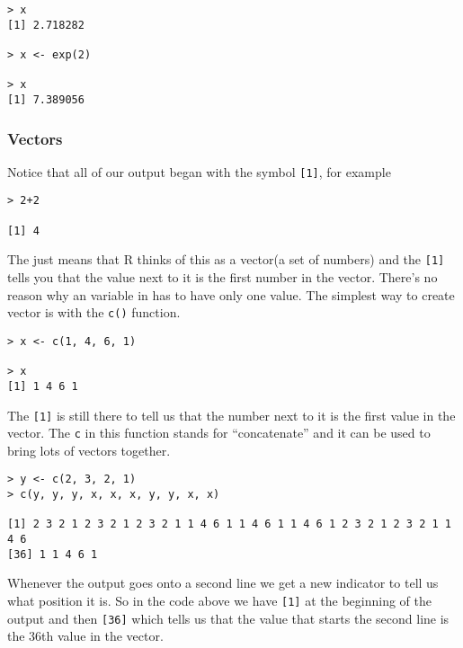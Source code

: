 \begin{lstlisting}
> x
[1] 2.718282

> x <- exp(2)

> x
[1] 7.389056
\end{lstlisting}


%

\subsubsection*{Vectors}
 
Notice that all of our output began with the symbol \texttt{[1]}, for example

\begin{lstlisting}
> 2+2

[1] 4
\end{lstlisting}

The just means that R thinks of this as a vector(a set of numbers) and the \texttt{[1]} tells you that the value next to it is the first number in the vector. There's no reason why an variable in \R has to have only one value. The simplest way to create vector is with the \texttt{c()} function.

\begin{lstlisting}
> x <- c(1, 4, 6, 1)

> x
[1] 1 4 6 1
\end{lstlisting}

The \texttt{[1]} is still there to tell us that the number next to it is the first value in the vector. The \texttt{c} in this function stands for ``concatenate'' and it can be used to bring lots of vectors together.

\begin{lstlisting}
> y <- c(2, 3, 2, 1)
> c(y, y, y, x, x, x, y, y, x, x)

[1] 2 3 2 1 2 3 2 1 2 3 2 1 1 4 6 1 1 4 6 1 1 4 6 1 2 3 2 1 2 3 2 1 1 4 6
[36] 1 1 4 6 1
\end{lstlisting}

Whenever the output goes onto a second line we get a new indicator to tell us what position it is. So in the code above we have \texttt{[1]} at the beginning of the output and then \texttt{[36]} which tells us that the value that starts the second line is the 36th value in the vector.

